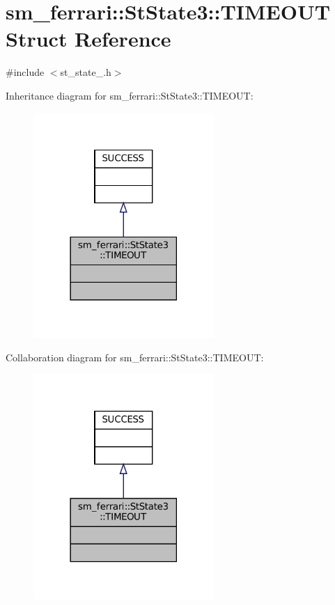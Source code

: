 \hypertarget{structsm__ferrari_1_1StState3_1_1TIMEOUT}{}\section{sm\+\_\+ferrari\+:\+:St\+State3\+:\+:T\+I\+M\+E\+O\+UT Struct Reference}
\label{structsm__ferrari_1_1StState3_1_1TIMEOUT}


{\ttfamily \#include $<$st\+\_\+state\+\_.\+h$>$}



Inheritance diagram for sm\+\_\+ferrari\+:\+:St\+State3\+:\+:T\+I\+M\+E\+O\+UT\+:
\nopagebreak
\begin{figure}[H]
\begin{center}
\leavevmode
\includegraphics[width=194pt]{structsm__ferrari_1_1StState3_1_1TIMEOUT__inherit__graph}
\end{center}
\end{figure}


Collaboration diagram for sm\+\_\+ferrari\+:\+:St\+State3\+:\+:T\+I\+M\+E\+O\+UT\+:
\nopagebreak
\begin{figure}[H]
\begin{center}
\leavevmode
\includegraphics[width=194pt]{structsm__ferrari_1_1StState3_1_1TIMEOUT__coll__graph}
\end{center}
\end{figure}



